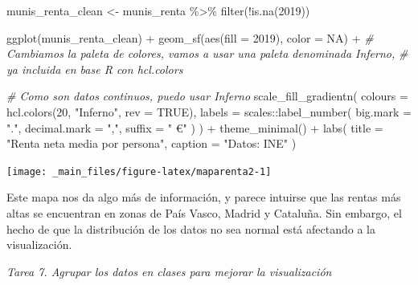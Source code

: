 \documentclass[
]{report}
\newenvironment{Shaded}{\begin{snugshade}}{\end{snugshade}}
\newcommand{\AttributeTok}[1]{\textcolor[rgb]{0.77,0.63,0.00}{#1}}
\newcommand{\CommentTok}[1]{\textcolor[rgb]{0.56,0.35,0.01}{\textit{#1}}}
\newcommand{\ConstantTok}[1]{\textcolor[rgb]{0.00,0.00,0.00}{#1}}
\newcommand{\DecValTok}[1]{\textcolor[rgb]{0.00,0.00,0.81}{#1}}
\newcommand{\FunctionTok}[1]{\textcolor[rgb]{0.00,0.00,0.00}{#1}}
\newcommand{\NormalTok}[1]{#1}
\newcommand{\OtherTok}[1]{\textcolor[rgb]{0.56,0.35,0.01}{#1}}
\newcommand{\SpecialCharTok}[1]{\textcolor[rgb]{0.00,0.00,0.00}{#1}}
\newcommand{\StringTok}[1]{\textcolor[rgb]{0.31,0.60,0.02}{#1}}
\theoremstyle{definition}
\theoremstyle{definition}
\theoremstyle{definition}
\theoremstyle{definition}
\theoremstyle{remark}
\begin{document}
\begin{Shaded}
\begin{Highlighting}[]

\NormalTok{munis\_renta\_clean }\OtherTok{\textless{}{-}}\NormalTok{ munis\_renta }\SpecialCharTok{\%\textgreater{}\%} \FunctionTok{filter}\NormalTok{(}\SpecialCharTok{!}\FunctionTok{is.na}\NormalTok{(}\StringTok{\textasciigrave{}}\AttributeTok{2019}\StringTok{\textasciigrave{}}\NormalTok{))}

\FunctionTok{ggplot}\NormalTok{(munis\_renta\_clean) }\SpecialCharTok{+}
  \FunctionTok{geom\_sf}\NormalTok{(}\FunctionTok{aes}\NormalTok{(}\AttributeTok{fill =} \StringTok{\textasciigrave{}}\AttributeTok{2019}\StringTok{\textasciigrave{}}\NormalTok{), }\AttributeTok{color =} \ConstantTok{NA}\NormalTok{) }\SpecialCharTok{+}
  \CommentTok{\# Cambiamos la paleta de colores, vamos a usar una paleta denominada Inferno,}
  \CommentTok{\# ya incluida en base R con hcl.colors}

  \CommentTok{\# Como son datos continuos, puedo usar Inferno}
  \FunctionTok{scale\_fill\_gradientn}\NormalTok{(}
    \AttributeTok{colours =} \FunctionTok{hcl.colors}\NormalTok{(}\DecValTok{20}\NormalTok{, }\StringTok{"Inferno"}\NormalTok{, }\AttributeTok{rev =} \ConstantTok{TRUE}\NormalTok{),}
    \AttributeTok{labels =}\NormalTok{ scales}\SpecialCharTok{::}\FunctionTok{label\_number}\NormalTok{(}
      \AttributeTok{big.mark =} \StringTok{"."}\NormalTok{,}
      \AttributeTok{decimal.mark =} \StringTok{","}\NormalTok{,}
      \AttributeTok{suffix =} \StringTok{" €"}
\NormalTok{    )}
\NormalTok{  ) }\SpecialCharTok{+}
  \FunctionTok{theme\_minimal}\NormalTok{() }\SpecialCharTok{+}
  \FunctionTok{labs}\NormalTok{(}
    \AttributeTok{title =} \StringTok{"Renta neta media por persona"}\NormalTok{,}
    \AttributeTok{caption =} \StringTok{"Datos: INE"}
\NormalTok{  )}
\end{Highlighting}
\end{Shaded}

\begin{center}\texttt{[image: \_main\_files/figure-latex/maparenta2-1]} \end{center}

Este mapa nos da algo más de información, y parece intuirse que las rentas más
altas se encuentran en zonas de País Vasco, Madrid y Cataluña. Sin embargo, el
hecho de que la distribución de los datos no sea normal está afectando a la
visualización.

\emph{Tarea 7. Agrupar los datos en clases para mejorar la visualización}
\end{document}
